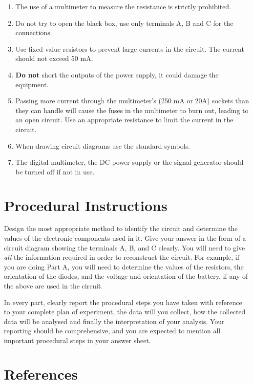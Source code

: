 \begin{enumerate}
\item The use of a multimeter to measure the resistance is strictly prohibited.
\item Do not try to open the black box, use only terminals A, B and C for the connections.
\item Use fixed value resistors to prevent large currents in the circuit. The current should not exceed 50 mA.
\item \textbf{Do not} short the outputs of the power supply, it could damage the equipment.
\item Passing more current through the multimeter's (250 mA or 20A) sockets than they can handle will cause the fuses in the multimeter to burn out, leading to an open circuit. Use an appropriate resistance to limit the current in the circuit.
\item When drawing circuit diagrams use the standard symbols.
\item The digital multimeter, the DC power supply or the signal generator should be turned off if not in use.

\end{enumerate}


\section*{Procedural Instructions}

Design the most appropriate method to identify the circuit and determine the values of the electronic components used  in it. Give your answer in the form of a circuit diagram showing the terminals A, B, and C clearly. You will need to give \textit{all} the information required in order to reconstruct the circuit. For example, if you are doing Part A, you will need to determine the values of the resistors, the orientation of the diodes, and the voltage and orientation of the battery, if any of the above are used in the circuit.

In every part, clearly report the procedural steps you have taken with reference to your complete plan of experiment, the data will you collect, how the collected data will be analysed and finally the interpretation of your analysis. Your reporting should be comprehensive, and you are expected to mention all important procedural steps in your answer sheet.



\section*{References}

